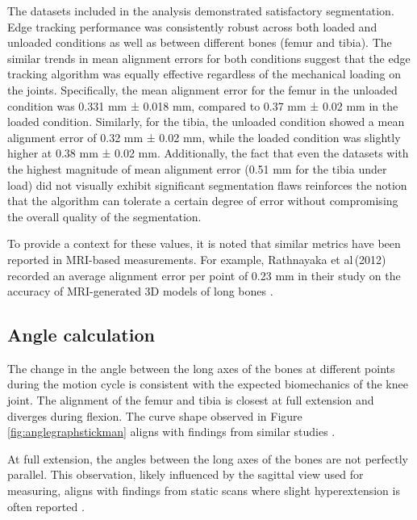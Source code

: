\documentclass{micro-econ-thesis}
\begin{document}
The datasets included in the analysis  demonstrated satisfactory segmentation. Edge tracking performance was consistently robust across both loaded and unloaded conditions as well as between different bones (femur and tibia). The similar trends in mean alignment errors for both conditions suggest that the edge tracking algorithm was equally effective regardless of the mechanical loading on the joints. Specifically, the mean alignment error for the femur in the unloaded condition was 0.331 mm ± 0.018 mm, compared to 0.37 mm ± 0.02 mm in the loaded condition. Similarly, for the tibia, the unloaded condition showed a mean alignment error of 0.32 mm ± 0.02 mm, while the loaded condition was slightly higher at 0.38 mm ± 0.02 mm. Additionally, the fact that even the datasets with the highest magnitude of mean alignment error (0.51 mm for the tibia under load) did not visually exhibit significant segmentation flaws reinforces the notion that the algorithm can tolerate a certain degree of error without compromising the overall quality of the segmentation.

To provide a context for these values, it is noted that similar metrics have been reported in MRI-based measurements. For example, Rathnayaka et al\,(2012) recorded an average alignment error per point of 0.23 mm in their study on the accuracy of MRI-generated 3D models of long bones \parencite{rathnayaka_quantification_2012}. 


\subsection{Angle calculation}

The change in the angle between the long axes of the bones at different points during the motion cycle is consistent with the expected biomechanics of the knee joint. The alignment of the femur and tibia is closest at full extension and diverges during flexion. The curve shape observed in Figure \ref{fig:anglegraphstickman} aligns with findings from similar studies \parencite{jeon_detection_2019}.

At full extension, the angles between the long axes of the bones are not perfectly parallel. This observation, likely influenced by the sagittal view used for measuring, aligns with findings from static scans where slight hyperextension is often reported \parencite{dai_comparing_2021}. 
\end{document}

